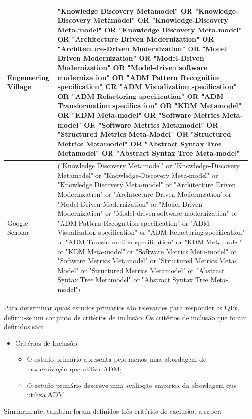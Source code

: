\begin{longtable}[!tb]{ | m{2cm} | m{12cm}| }
 \hline
 Engeneering Village & "Knowledge Discovery Metamodel" OR "Knowledge-Discovery Metamodel" OR "Knowledge-Discovery Meta-model" OR "Knowledge Discovery Meta-model" OR "Architecture Driven Modernization" OR "Architecture-Driven Modernization" OR "Model Driven Modernization" OR "Model-Driven Modernization" OR "Model-driven software modernization" OR "ADM Pattern Recognition specification" OR "ADM Visualization specification" OR "ADM Refactoring specification" OR "ADM Transformation specification" OR "KDM Metamodel" OR "KDM Meta-model" OR "Software Metrics Meta-model" OR "Software Metrics Metamodel" OR "Structured Metrics Meta-Model" OR "Structured Metrics Metamodel" OR "Abstract Syntax Tree Metamodel" OR "Abstract Syntax Tree Meta-model"\\
 \hline
 Google Scholar & ("Knowledge Discovery Metamodel" or "Knowledge-Discovery Metamodel" or "Knowledge-Discovery Meta-model" or "Knowledge Discovery Meta-model" or "Architecture Driven Modernization" or "Architecture-Driven Modernization" or "Model Driven Modernization" or "Model-Driven Modernization" or "Model-driven software modernization" or "ADM Pattern Recognition specification" or "ADM Visualization specification" or "ADM Refactoring specification" or "ADM Transformation specification" or "KDM Metamodel" or "KDM Meta-model" or "Software Metrics Meta-model" or "Software Metrics Metamodel" or "Structured Metrics Meta-Model" or "Structured Metrics Metamodel" or "Abstract Syntax Tree Metamodel" or "Abstract Syntax Tree Meta-model")\\
 \hline
 \end{longtable}

Para determinar quais estudos primários são relevantes para responder as QPs, definiu-se um conjunto de critérios de inclusão. Os critérios de inclusão que foram definidos são:

\begin{itemize}
\item Critérios de Inclusão:
    \begin{itemize}
    \item O estudo primário apresenta pelo menos uma abordagem de modernização que utiliza ADM;
\item O estudo primário descreve uma avaliação empirica da abordagem que utiliza ADM.
    \end{itemize}
\end{itemize}

Similarmente, também foram definidos três critérios de exclusão, a saber:

